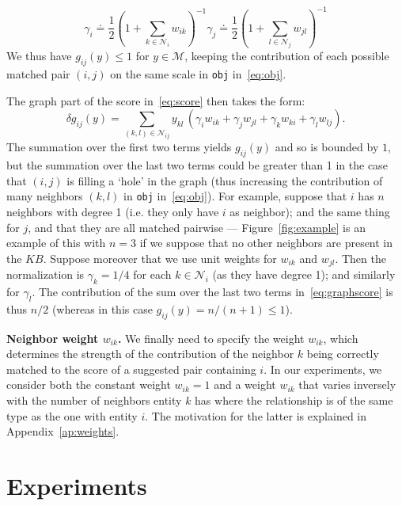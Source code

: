 \documentclass{sig-alternate}
\newcommand{\KB}{K\!B}
\begin{document}
{\addtolength\abovedisplayskip{-3mm} %
\begin{equation} \label{eq:gamma_i}
    \gamma_i \doteq \frac{1}{2} \left(1 + \sum_{k \in \mathcal{N}_{i}} w_{ik} \right)^{-1} \gamma_j \doteq \frac{1}{2} \left(1 + \sum_{l \in \mathcal{N}_{j}} w_{jl} \right)^{-1}
\end{equation}
}We thus have $g_{ij}(y) \leq 1$ for $y \in \mathcal{M}$, keeping the contribution of each possible matched pair $(i,j)$ on the same scale in \texttt{obj} in~\eqref{eq:obj}.

The graph part of the score in~\eqref{eq:score} then takes the form:
\begin{equation} \label{eq:graphscore}
     \delta g_{ij}(y)  = \sum_{(k,l) \in \mathcal{N}_{ij}} y_{kl} \, ( \gamma_i w_{ik} + \gamma_j w_{jl} + \gamma_k w_{ki} + \gamma_l w_{lj}).
\end{equation}
The summation over the first two terms yields $g_{ij}(y)$ and so is bounded by $1$, but the summation over the last two terms could be greater than 1 in the case that $(i,j)$ is filling a `hole' in the graph (thus increasing the contribution of many neighbors $(k,l)$ in \texttt{obj} in~\eqref{eq:obj}). For example, suppose that $i$ has $n$ neighbors with degree 1 (i.e. they only have $i$ as neighbor); and the same thing for $j$, and that they are all matched pairwise --- Figure~\ref{fig:example} is an example of this with $n=3$ if we suppose that no other neighbors are present in the $\KB$. Suppose moreover that we use unit weights for $w_{ik}$ and $w_{jl}$. Then the normalization is $\gamma_k = 1/4$ for each $k \in \mathcal{N}_i$ (as they have degree 1); and similarly for $\gamma_l$. The contribution of the sum over the last two terms in~\eqref{eq:graphscore} is thus $n/2$ (whereas in this case $g_{ij}(y) = n/(n+1) \leq 1$).

\textbf{Neighbor weight $w_{ik}$.}
We finally need to specify the weight $w_{ik}$, which determines the strength of the contribution of the neighbor $k$ being correctly matched to the score of a suggested pair containing $i$. In our experiments, we consider both the constant weight $w_{ik} = 1$ and a weight $w_{ik}$ that varies inversely with the number of neighbors entity $k$ has where the relationship is of the same type as the one with entity $i$. The motivation for the latter is explained in Appendix~\ref{ap:weights}.

%
%
%
%
%
%
%
%
%

\section{Experiments} \label{sec:experiments}
\end{document}
